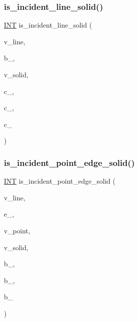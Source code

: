 \subsubsection{\texorpdfstring{is\+\_\+incident\+\_\+line\+\_\+solid()}{is\_incident\_line\_solid()}}
{\footnotesize\ttfamily \mbox{\hyperlink{galois_8h_a09fddde158a3a20bd2dcadb609de11dc}{I\+NT}} is\+\_\+incident\+\_\+line\+\_\+solid (\begin{DoxyParamCaption}\item[{\mbox{\hyperlink{galois_8h_a09fddde158a3a20bd2dcadb609de11dc}{I\+NT}} $\ast$}]{v\+\_\+line,  }\item[{\mbox{\hyperlink{galois_8h_a09fddde158a3a20bd2dcadb609de11dc}{I\+NT}}}]{b\+\_,  }\item[{\mbox{\hyperlink{galois_8h_a09fddde158a3a20bd2dcadb609de11dc}{I\+NT}} $\ast$}]{v\+\_\+solid,  }\item[{\mbox{\hyperlink{galois_8h_a09fddde158a3a20bd2dcadb609de11dc}{I\+NT}}}]{c\+\_,  }\item[{\mbox{\hyperlink{galois_8h_a09fddde158a3a20bd2dcadb609de11dc}{I\+NT}}}]{c\+\_,  }\item[{\mbox{\hyperlink{galois_8h_a09fddde158a3a20bd2dcadb609de11dc}{I\+NT}}}]{c\+\_ }\end{DoxyParamCaption})}

\mbox{\label{hamming_8_c_ab4a5b9787ab77b4b222f15f6c34558de}} 
\subsubsection{\texorpdfstring{is\+\_\+incident\+\_\+point\+\_\+edge\+\_\+solid()}{is\_incident\_point\_edge\_solid()}}
{\footnotesize\ttfamily \mbox{\hyperlink{galois_8h_a09fddde158a3a20bd2dcadb609de11dc}{I\+NT}} is\+\_\+incident\+\_\+point\+\_\+edge\+\_\+solid (\begin{DoxyParamCaption}\item[{\mbox{\hyperlink{galois_8h_a09fddde158a3a20bd2dcadb609de11dc}{I\+NT}} $\ast$}]{v\+\_\+line,  }\item[{\mbox{\hyperlink{galois_8h_a09fddde158a3a20bd2dcadb609de11dc}{I\+NT}}}]{e\+\_,  }\item[{\mbox{\hyperlink{galois_8h_a09fddde158a3a20bd2dcadb609de11dc}{I\+NT}} $\ast$}]{v\+\_\+point,  }\item[{\mbox{\hyperlink{galois_8h_a09fddde158a3a20bd2dcadb609de11dc}{I\+NT}} $\ast$}]{v\+\_\+solid,  }\item[{\mbox{\hyperlink{galois_8h_a09fddde158a3a20bd2dcadb609de11dc}{I\+NT}}}]{b\+\_,  }\item[{\mbox{\hyperlink{galois_8h_a09fddde158a3a20bd2dcadb609de11dc}{I\+NT}}}]{b\+\_,  }\item[{\mbox{\hyperlink{galois_8h_a09fddde158a3a20bd2dcadb609de11dc}{I\+NT}}}]{b\+\_ }\end{DoxyParamCaption})}

